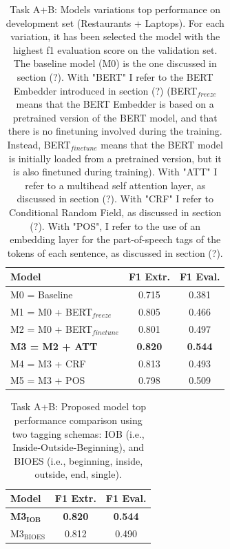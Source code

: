 \documentclass[11pt,a4paper]{article}
\begin{document}
	
	\begin{table}[H]
		\centering
		\begin{tabular}{@{}lcc@{}}
			\toprule
			\textbf{Model}         & F1 Extr.       & F1 Eval.       \\ \midrule
			M0 = Baseline          & 0.715          & 0.381          \\
			M1 = M0 + BERT$_{freeze}$         & 0.805          & 0.466          \\
			M2 = M0 + BERT$_{finetune}$        & 0.801          & 0.497          \\
			\textbf{M3 = M2 + ATT} & \textbf{0.820} & \textbf{0.544} \\
			M4 = M3 + CRF          & 0.813          & 0.493          \\
			M5 = M3 + POS          & 0.798          & 0.509          \\ \bottomrule
		\end{tabular}
		\caption{Task A+B: Models variations top performance on development set (Restaurants + Laptops). For each variation, it has been selected the model with the highest f1 evaluation score on the validation set. \\ The baseline model (M0) is the one discussed in section (?). With "BERT" I refer to the BERT Embedder introduced in section (?) (BERT$_{freeze}$ means that the BERT Embedder is based on a pretrained version of the BERT model, and that there is no finetuning involved during the training. Instead, BERT$_{finetune}$ means that the BERT model is initially loaded from a pretrained version, but it is also finetuned during training). With "ATT" I refer to a multihead self attention layer, as discussed in section (?). With "CRF" I refer to Conditional Random Field, as discussed in section (?). With "POS", I refer to the use of an embedding layer for the part-of-speech tags of the tokens of each sentence, as discussed in section (?).}
		\label{tab:my-table}
	\end{table}

	\begin{table}[H]
		\centering
		\begin{tabular}{@{}lcc@{}}
			\toprule
			\textbf{Model}                        & F1 Extr.       & F1 Eval.       \\ \midrule
			\textbf{M3$_{\mathbf{IOB}}$} & \textbf{0.820} & \textbf{0.544} \\
			M3$_{\mathrm{BIOES}}$                         & 0.812          & 0.490          \\ \bottomrule
		\end{tabular}
		\caption{Task A+B: Proposed model top performance comparison using two tagging schemas: IOB (i.e., Inside-Outside-Beginning), and BIOES (i.e., beginning, inside, outside, end, single).}
		\label{tab:my-table}
	\end{table}
	
\end{document}
